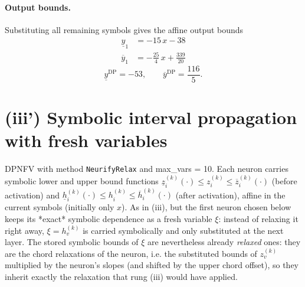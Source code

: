 \documentclass[11pt]{article}
\begin{document}
\paragraph{Output bounds.}
Substituting all remaining symbols gives the affine output bounds
\begin{align*}
\underline{y}_{1} &= -15\,x - 38
\end{align*}
\begin{align*}
\overline{y}_{1} &= -\frac{25}{4}\,x + \frac{339}{20}
\end{align*}
\begin{equation*}
\underline{y}^{\text{DP}} = -53, \qquad \overline{y}^{\text{DP}} = \frac{116}{5}.
\end{equation*}

\section{(iii') Symbolic interval propagation with fresh variables}
DPNFV with method \texttt{NeurifyRelax} and max\_vars = 10. Each neuron carries symbolic lower and upper bound functions
$\underline{z}^{(k)}_i(\cdot) \le z^{(k)}_i \le \overline{z}^{(k)}_i(\cdot)$ (before activation)
and $\underline{h}^{(k)}_i(\cdot) \le h^{(k)}_i \le \overline{h}^{(k)}_i(\cdot)$ (after activation),
affine in the current symbols (initially only $x$).
As in (iii), but the first neuron chosen below keeps its *exact*
symbolic dependence as a fresh variable $\xi$: instead of relaxing it right away, $\xi = h^{(k)}_v$
is carried symbolically and only substituted at the next layer. The stored symbolic bounds of $\xi$
are nevertheless already \emph{relaxed} ones: they are the chord relaxations of the neuron, i.e.
the substituted bounds of $z^{(k)}_v$ multiplied by the neuron's slopes (and shifted by the upper
chord offset), so they inherit exactly the relaxation that rung (iii) would have applied.
\end{document}
